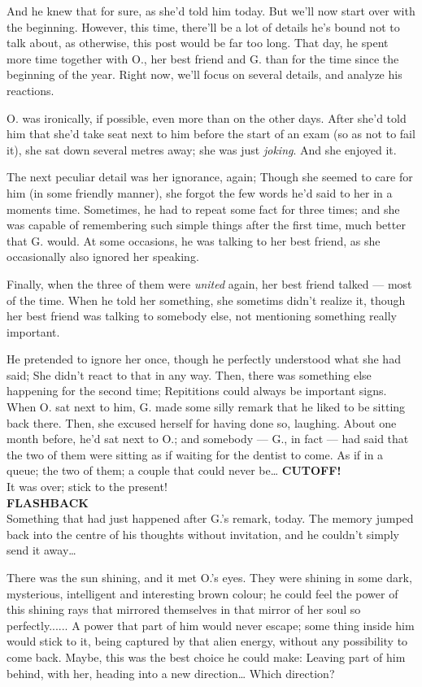 And he knew that for sure, as she'd told him today. 
But we'll now start over with the beginning. 
However, this time, there'll be a lot of details he's bound not to talk about, as otherwise, this post would be far too long. 
That day, he spent more time together with O., her best friend and G. than for the time since the beginning of the year. 
Right now, we'll focus on several details, and analyze his reactions.

O. was ironically, if possible, even more than on the other days. After she'd told him that she'd take seat next to him before the start of an exam (so as not to fail it), she sat down several metres away; she was just \emph{joking}. 
And she enjoyed it.

The next peculiar detail was her ignorance, again; Though she seemed to care for him (in some friendly manner), she forgot the few words he'd said to her in a moments time. 
Sometimes, he had to repeat some fact for three times; and she was capable of remembering such simple things after the first time, much better that G. would. 
At some occasions, he was talking to her best friend, as she occasionally also ignored her speaking.

Finally, when the three of them were \emph{united} again, her best friend talked --- most of the time. When he told her something, she sometims didn't realize it, though her best friend was talking to somebody else, not mentioning something really important.

He pretended to ignore her once, though he perfectly understood what she had said; She didn't react to that in any way. 
Then, there was something else happening for the second time; Repititions could always be important signs. 
When O. sat next to him, G. made some silly remark that he liked to be sitting back there. Then, she excused herself for having done so, laughing. 
About one month before, he'd sat next to O.; and somebody --- G., in fact --- had said that the two of them were sitting as if waiting for the dentist to come. 
As if in a queue; the two of them; a couple that could never be\ldots
\textbf{CUTOFF!}\\
It was over; stick to the present!\\
\textbf{FLASHBACK}\\
Something that had just happened after G.'s remark, today. 
The memory jumped back into the centre of his thoughts without invitation, and he couldn't simply send it away\ldots

There was the sun shining, and it met O.'s eyes. 
They were shining in some dark, mysterious, intelligent and interesting brown colour; he could feel the power of this shining rays that mirrored themselves in that mirror of her soul so perfectly......
A power that part of him would never escape; some thing inside him would stick to it, being captured by that alien energy, without any possibility to come back. 
Maybe, this was the best choice he could make: Leaving part of him behind, with her, heading into a new direction\ldots
Which direction?


